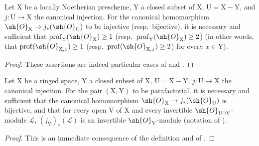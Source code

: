 \begin{lemma}[21.13.4]
\label{IV.21.13.4}
Let $\mathrm{X}$ be a locally Noetherian prescheme, $\mathrm{Y}$ a closed subset of $\mathrm{X}$, $\mathrm{U}=\mathrm{X}-\mathrm{Y}$, and $j:\mathrm{U}\to\mathrm{X}$ the canonical injection.
For the canonical homomorphism $\sh{O}_{\mathrm{X}}\to j_*(\sh{O}_{\mathrm{U}})$ to be injective (resp.\ bijective), it is necessary and sufficient that $\operatorname{prof}_{\mathrm{Y}}(\sh{O}_{\mathrm{X}})\geq 1$ (resp.\ $\operatorname{prof}_{\mathrm{Y}}(\sh{O}_{\mathrm{X}})\geq 2$) (in other words, that $\operatorname{prof}(\sh{O}_{\mathrm{X},x})\geq 1$ (resp.\ $\operatorname{prof}(\sh{O}_{\mathrm{X},x})\geq 2$) for every $x\in\mathrm{Y}$).
\end{lemma}

\begin{proof}
These assertions are indeed particular cases of  and .
\end{proof}

\begin{proposition}[21.13.5]
\label{IV.21.13.5}
Let $\mathrm{X}$ be a ringed space, $\mathrm{Y}$ a closed subset of $\mathrm{X}$, $\mathrm{U}=\mathrm{X}-\mathrm{Y}$, $j:\mathrm{U}\to\mathrm{X}$ the canonical injection.
For the pair $(\mathrm{X},\mathrm{Y})$ to be parafactorial, it is necessary and sufficient that the canonical homomorphism $\sh{O}_{\mathrm{X}}\to j_*(\sh{O}_{\mathrm{U}})$ is bijective, and that for every open $\mathrm{V}$ of $\mathrm{X}$ and every invertible $\sh{O}_{\mathrm{U}\cap\mathrm{V}}$-module $\mathscr{L}$, $(j_{\mathrm{V}})_*(\mathscr{L})$ is an invertible $\sh{O}_{\mathrm{V}}$-module (notation of ).
\end{proposition}

\begin{proof}
This is an immediate consequence of the definition  and of .
\end{proof}


